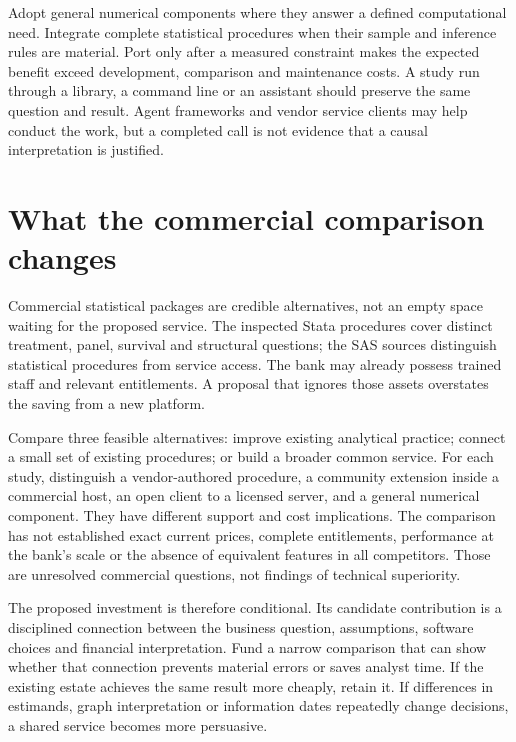 Adopt general numerical components where they answer a defined computational
need. Integrate complete statistical procedures when their sample and inference
rules are material. Port only after a measured constraint makes the expected
benefit exceed development, comparison and maintenance costs. A study run
through a library, a command line or an assistant should preserve the same
question and result. Agent frameworks and vendor service clients may help
conduct the work, but a completed call is not evidence that a causal
interpretation is justified.
\citep{exec24_framework_contracts,exec23_workflow_sasctl}

\section{What the commercial comparison changes}
Commercial statistical packages are credible alternatives, not an empty space
waiting for the proposed service. The inspected Stata procedures cover distinct
treatment, panel, survival and structural questions; the SAS sources distinguish
statistical procedures from service access. The bank may already possess
trained staff and relevant entitlements. A proposal that ignores those assets
overstates the saving from a new platform.
\citep{exec13_ci_stata_causal_intro,exec18_gp_stata_xthdid,
exec14_survival_stata,exec13_ivrd_sas,exec23_workflow_sasctl}

Compare three feasible alternatives: improve existing analytical practice;
connect a small set of existing procedures; or build a broader common service.
For each study, distinguish a vendor-authored procedure, a community extension
inside a commercial host, an open client to a licensed server, and a general
numerical component. They have different support and cost implications. The
comparison has not established exact current prices, complete entitlements,
performance at the bank's scale or the absence of equivalent features in all
competitors. Those are unresolved commercial questions, not findings of
technical superiority.

The proposed investment is therefore conditional. Its candidate contribution
is a disciplined connection between the business question, assumptions,
software choices and financial interpretation. Fund a narrow comparison that
can show whether that connection prevents material errors or saves analyst
time. If the existing estate achieves the same result more cheaply, retain it.
If differences in estimands, graph interpretation or information dates repeatedly
change decisions, a shared service becomes more persuasive.

